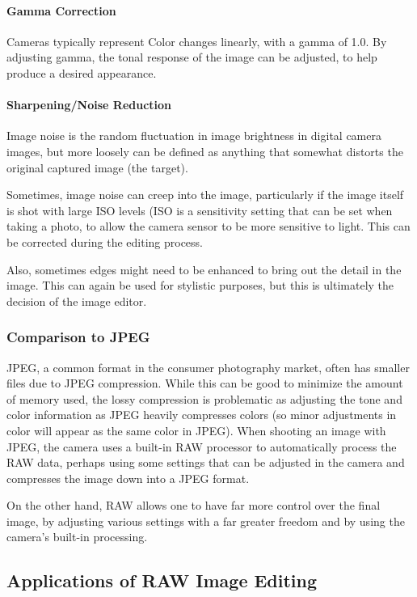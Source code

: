 \documentclass[10pt,a4paper]{article}
\begin{document}
\paragraph{Gamma Correction}
Cameras typically represent Color changes linearly, with a gamma of 1.0. 
By adjusting gamma, the tonal response of the image can be adjusted, to help produce a desired appearance.
\paragraph{Sharpening/Noise Reduction}
Image noise is the random fluctuation in image brightness in digital camera images, but more loosely can be defined as anything that somewhat distorts
the original captured image (the target).

Sometimes, image noise can creep into the image, particularly if the image itself is shot with large ISO levels (ISO is a sensitivity setting that can be
set when taking a photo, to allow the camera sensor to be more sensitive to light. This can be corrected during the editing process. 

Also, sometimes edges might need to be enhanced to bring out the detail in the image. This can again be used for stylistic purposes, but this is ultimately the
decision of the image editor. 
 
\subsubsection{Comparison to JPEG}
JPEG, a common format in the consumer photography market, often has smaller files due to JPEG compression.
While this can be good to minimize the amount of memory used, the lossy compression is problematic as adjusting the tone
and color information as JPEG heavily compresses colors (so minor adjustments in color will appear as the same color in JPEG).
When shooting an image with JPEG, the camera uses a built-in RAW processor to automatically process the RAW data, perhaps using some settings
that can be adjusted in the camera and compresses the image down into a JPEG format.

On the other hand, RAW allows one to have far more control over the final image, by adjusting various settings with a far greater freedom and by using the camera's
built-in processing.

\cite{UnderstandingRAWCapture}

\subsection{Applications of RAW Image Editing}
\end{document}
